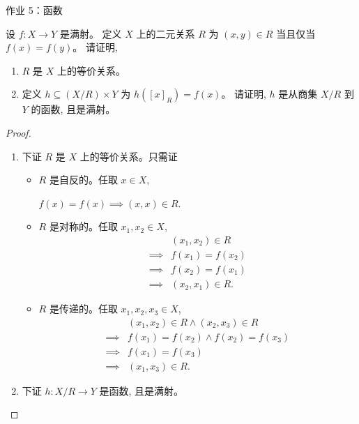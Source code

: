 
\begin{frame}[allowframebreaks]{作业 5：函数}

\begin{problem}[函数与等价关系]
  设 $f: X \to Y$ 是满射。
  定义 $X$ 上的二元关系 $R$ 为 $(x, y) \in R$ 当且仅当 $f(x) = f(y)$。
  请证明,
  \begin{enumerate}[(1)]
    \item $R$ 是 $X$ 上的等价关系。
    \item 定义 $h \subseteq (X/R) \times Y$ 为 $h([x]_{R}) = f(x)$。
      请证明, $h$ 是从商集 $X/R$ 到 $Y$ 的函数, 且是满射。
  \end{enumerate}
\end{problem}

\begin{proof}
  \begin{enumerate}[(1)]
    \item 下证 $R$ 是 $X$ 上的等价关系。只需证
      \begin{itemize}
        \item $R$ 是自反的。任取 $x \in X$,

          $f(x) = f(x) \implies (x, x) \in R$.
        \item $R$ 是对称的。任取 $x_{1}, x_{2} \in X$,
          \begin{align*}
            & (x_{1}, x_{2}) \in R \\
            \implies & f(x_{1}) = f(x_{2}) \\
            \implies & f(x_{2}) = f(x_{1}) \\
            \implies & (x_{2}, x_{1}) \in R.
          \end{align*}
        \item $R$ 是传递的。任取 $x_{1}, x_{2}, x_{3} \in X$,
          \begin{align*}
            & (x_{1}, x_{2}) \in R \land (x_{2}, x_{3}) \in R \\
            \implies & f(x_{1}) = f(x_{2}) \land f(x_{2}) = f(x_{3}) \\
            \implies & f(x_{1}) = f(x_{3}) \\
            \implies & (x_{1}, x_{3}) \in R.
          \end{align*}
      \end{itemize}
    \item 下证 $h: X/R \to Y$ 是函数, 且是满射。


\end{enumerate}
\end{proof}
\end{frame}
